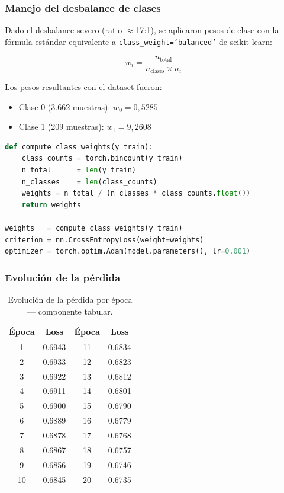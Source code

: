 \documentclass[12pt,a4paper]{article}
\begin{document}
\subsubsection{Manejo del desbalance de clases}

Dado el desbalance severo (ratio $\approx$17:1), se aplicaron pesos de clase
con la fórmula estándar equivalente a \texttt{class\_weight='balanced'}
de scikit-learn:

\[
  w_i = \frac{n_{\text{total}}}{n_{\text{clases}} \times n_i}
\]

Los pesos resultantes con el dataset fueron:
\begin{itemize}
  \item Clase 0 (3.662 muestras): $w_0 = 0{,}5285$
  \item Clase 1 (209 muestras):   $w_1 = 9{,}2608$
\end{itemize}

\begin{lstlisting}[language=Python, caption={Cálculo de pesos de clase (\texttt{train.py})}]
def compute_class_weights(y_train):
    class_counts = torch.bincount(y_train)
    n_total      = len(y_train)
    n_classes    = len(class_counts)
    weights = n_total / (n_classes * class_counts.float())
    return weights

weights   = compute_class_weights(y_train)
criterion = nn.CrossEntropyLoss(weight=weights)
optimizer = torch.optim.Adam(model.parameters(), lr=0.001)
\end{lstlisting}

\subsubsection{Evolución de la pérdida}

\begin{table}[H]
  \centering
  \begin{tabular}{cc|cc}
    \toprule
    \textbf{Época} & \textbf{Loss} & \textbf{Época} & \textbf{Loss} \\
    \midrule
     1 & 0.6943 & 11 & 0.6834 \\
     2 & 0.6933 & 12 & 0.6823 \\
     3 & 0.6922 & 13 & 0.6812 \\
     4 & 0.6911 & 14 & 0.6801 \\
     5 & 0.6900 & 15 & 0.6790 \\
     6 & 0.6889 & 16 & 0.6779 \\
     7 & 0.6878 & 17 & 0.6768 \\
     8 & 0.6867 & 18 & 0.6757 \\
     9 & 0.6856 & 19 & 0.6746 \\
    10 & 0.6845 & 20 & 0.6735 \\
    \bottomrule
  \end{tabular}
  \caption{Evolución de la pérdida por época — componente tabular.}
\end{table}
\end{document}
